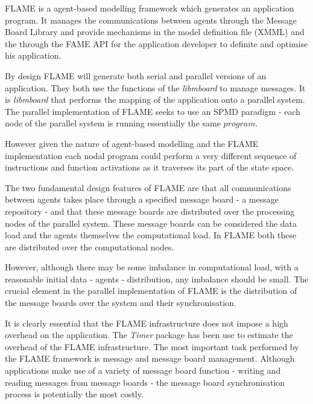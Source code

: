 \label{sec:performance-flame}
FLAME is a agent-based modelling framework which generates an application program. It manages the communications between agents through the Message Board Library and provide mechanisms in the model definition file (XMML) and the through the FAME API for the application developer to definite and optimise his application.

By design FLAME will generate both serial and parallel versions of an application. They both use the functions of the \textit{libmboard} to manage messages. It is \textit{libmboard} that performs the mapping of the application onto a parallel system. The parallel implementation of FLAME seeks to use an SPMD paradigm - each node of the parallel system is running essentially the same $program$. 

However given the nature of agent-based modelling and the FLAME implementation each nodal program could perform a very different sequence of instructions and function activations as it traverses its part of the state space. 

The two fundamental design features of FLAME are that all communications between agents takes place through a specified message board - a message repository - and that these message boards are distributed over the processing nodes of the parallel system. These message boards can be considered the data load and the agents themselves the computational load. In FLAME both these are distributed over the computational nodes.

However, although there may be some imbalance in computational load, with a reasonable initial data - agents - distribution, any imbalance should be small. The crucial element in the parallel implementation of FLAME is the distribution of the message boards over the system and their synchronisation.

It is clearly essential that the FLAME infrastructure does not impose a high overhead on the application. The \textit{Timer} package has been use to estimate the overhead of the FLAME infrastructure. The most important task performed by the FLAME framework is message and  message board management. Although applications make use of a variety of message board function - writing and reading messages from message boards - the message board synchronisation process is potentially the most costly.

